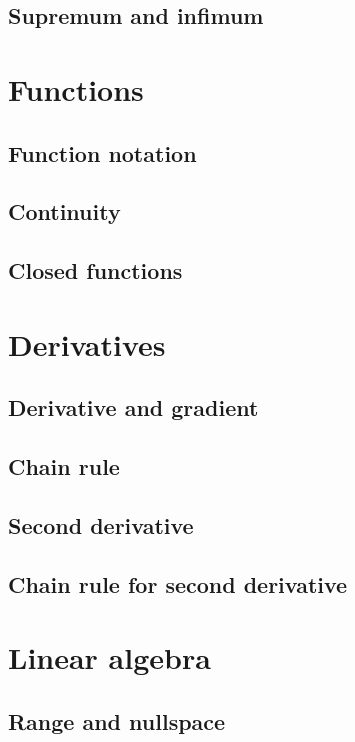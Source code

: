 \subsection{Supremum and infimum}

\section{Functions}

\subsection{Function notation}


\subsection{Continuity}

\subsection{Closed functions}


\section{Derivatives}


\subsection{Derivative and gradient}

\subsection{Chain rule}

\subsection{Second derivative}



\subsection{Chain rule for second derivative}

\section{Linear algebra}

\subsection{Range and nullspace}

